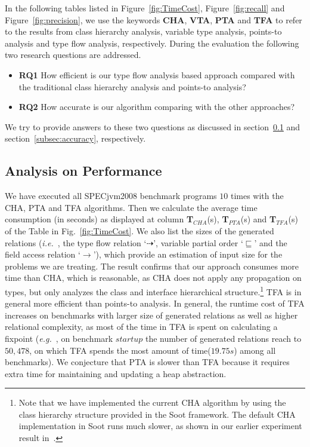 \documentclass{fac}
\newcommand\eg{\textit{e.g.\ }}
\newcommand\ie{\textit{i.e.\ }}
\newcommand{\less}{\sqsubseteq}
\newcommand{\tflow}{\dashrightarrow}
\newcommand{\hflow}{\longrightarrow}
\begin{document}
In the following tables listed in Figure~\ref{fig:TimeCost}, Figure~\ref{fig:recall} and Figure~\ref{fig:precision}, we use the keywords \textbf{CHA}, \textbf{VTA}, \textbf{PTA} and \textbf{TFA} to refer to the results from class hierarchy analysis, variable type analysis, points-to analysis and type flow analysis, respectively. During the evaluation the following two research questions are addressed. %
\begin{itemize}
\item \textbf{RQ1} How efficient is our type flow analysis based approach compared with the traditional class hierarchy analysis and points-to analysis?
\item \textbf{RQ2} How accurate is our algorithm comparing with the other approaches?
\end{itemize}
We try to provide answers to these two questions as discussed in section~\ref{subsec:efficiency} and section~\ref{subsec:accuracy}, respectively.

\subsection{Analysis on Performance}\label{subsec:efficiency}

We have executed all SPECjvm2008 benchmark programs $10$ times with the CHA, PTA and TFA algorithms. Then we calculate the average time consumption (in seconds) as displayed at column \textbf{T$_{CHA}$}(s), \textbf{T$_{PTA}$}(s) and \textbf{T$_{TFA}$}(s) of the Table in Fig.~\ref{fig:TimeCost}. We also list the sizes of the generated relations (\ie, the type flow relation `$\tflow$', variable partial order `$\less$' and the field access relation `$\hflow$'), which provide an estimation of input size for the problems we are treating. The result confirms that our approach consumes more time than CHA, which is reasonable, as CHA does not apply any propagation on types, but only analyzes the class and interface hierarchical structure.\footnote{Note that we have implemented the current CHA algorithm by using the class hierarchy structure provided in the Soot framework. The default CHA implementation in Soot runs much slower, as shown in our earlier experiment result in~\cite{ZhuoZ19}.} TFA is in general more efficient than points-to analysis. In general, the runtime cost of TFA increases on benchmarks with larger size of generated relations as well as higher relational complexity, as most of the time in TFA is spent on calculating a fixpoint (\eg, on benchmark $startup$ the number of generated relations reach to $50,478$, on which TFA spends the most amount of time($19.75s$) among all benchmarks). We conjecture that PTA is slower than TFA because it requires extra time for maintaining and updating a heap abstraction.
\end{document}
